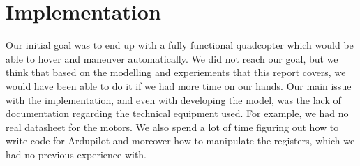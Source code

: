 \section{Implementation}
Our initial goal was to end up with a fully functional quadcopter which would be able to hover and maneuver automatically. We did not reach our goal, but we think that based on the modelling and experiements that this report covers, we would have been able to do it if we had more time on our hands. Our main issue with the implementation, and even with developing the model, was the lack of documentation regarding the technical equipment used. For example, we had no real datasheet for the motors. We also spend a lot of time figuring out how to write code for Ardupilot and moreover how to manipulate the registers, which we had no previous experience with.